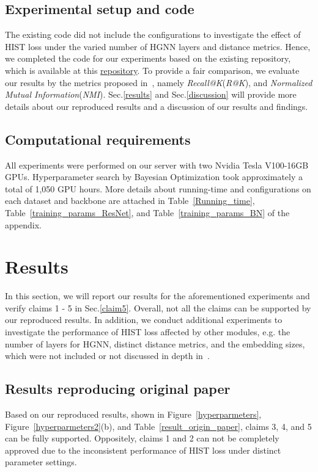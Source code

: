 \subsection{Experimental setup and code}
The existing code did not include the configurations to investigate the effect of HIST loss under the varied number of HGNN layers and distance metrics. Hence, we completed the code for our experiments based on the existing repository, which is available at this \href{https://anonymous.4open.science/r/MLRC2022_HIST-9598/}{repository}. To provide a fair comparison, we evaluate our results by the metrics proposed in~\cite{lim2022hypergraph}, namely \textit{Recall@K}(\textit{R@K}), and \textit{Normalized Mutual Information}(\textit{NMI}). Sec.\ref{results} and Sec.\ref{discussion} will provide more details about our reproduced results and a discussion of our results and findings.

\subsection{Computational requirements}
All experiments were performed on our server with two Nvidia Tesla V100-16GB GPUs. Hyperparameter search by Bayesian Optimization took approximately a total of 1,050 GPU hours.  More details about running-time and configurations on each dataset and backbone are attached in Table~\ref{Running_time}, Table~\ref{training_params_ResNet}, and Table~\ref{training_params_BN} of the appendix.

\section{Results\label{results}}
In this section, we will report our results for the aforementioned experiments and verify claims 1 - 5 in Sec.\ref{claim5}. Overall, not all the claims can be supported by our reproduced results. In addition, we conduct additional experiments to investigate the performance of HIST loss affected by other modules, e.g. the number of layers for HGNN, distinct distance metrics, and the embedding sizes, which were not included or not discussed in depth in~\cite{lim2022hypergraph}.


\subsection{Results reproducing original paper}
Based on our reproduced results, shown in Figure~\ref{hyperparmeters}, Figure~\ref{hyperparmeters2}(b), and Table~\ref{result_origin_paper}, claims 3, 4, and 5 can be fully supported. Oppositely, claims 1 and 2 can not be completely approved due to the inconsistent performance of HIST loss under distinct parameter settings.

